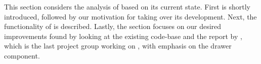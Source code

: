 This section considers the analysis of \launcher based on its current state.
First \launcher is shortly introduced, followed by our motivation for taking over its development.
Next, the functionality of \launcher is described.
Lastly, the section focuses on our desired improvements found by looking at the existing code-base and the report by \citet{launcher2012}, which is the last project group working on \launcher, with emphasis on the drawer component.